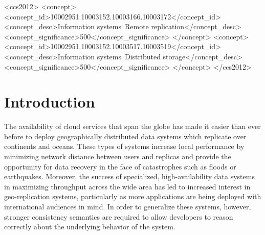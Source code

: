 \documentclass[sigplan,screen,review,anonymous,nonacm]{acmart}
\begin{document}
\begin{CCSXML}
<ccs2012>
    <concept>
        <concept_id>10002951.10003152.10003166.10003172</concept_id>
        <concept_desc>Information systems~Remote replication</concept_desc>
        <concept_significance>500</concept_significance>
    </concept>
    <concept>
        <concept_id>10002951.10003152.10003517.10003519</concept_id>
        <concept_desc>Information systems~Distributed storage</concept_desc>
        <concept_significance>500</concept_significance>
    </concept>
</ccs2012>
\end{CCSXML}



\maketitle

\section{Introduction}

The availability of cloud services that span the globe has made it easier than ever
before to deploy geographically distributed data systems which replicate over 
continents and oceans. 
These types of systems increase local performance by minimizing network distance 
between users and replicas and provide the opportunity for data recovery in the face
of catastrophes such as floods or earthquakes. 
Moreover, the success of specialized, high-availability data systems~\cite{megastore} 
in maximizing throughput across the wide area has led to increased interest in 
geo-replication systems, particularly as more applications are being deployed with
international audiences in mind.
In order to generalize these systems, however, stronger consistency semantics are 
required to allow developers to reason correctly about the underlying behavior of 
the system. 
\end{document}
